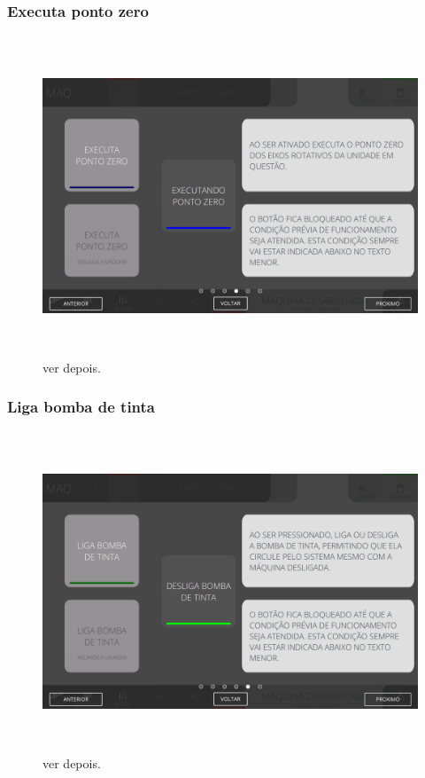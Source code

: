\newpage
\thispagestyle{fancy}
\vspace*{\fill}
\subsubsection{\small{Executa ponto zero}}
\begin{figure}[h]
  \centering
  \includegraphics[width=576px,height=360px]{src/images/04-printter/02-printter/commands/e-4.png}
  \caption{ver depois.}
   \label{}
\end{figure}
\vspace*{\fill}

\newpage
\thispagestyle{fancy}
\vspace*{\fill}
\subsubsection{\small{Liga bomba de tinta}}
\begin{figure}[h]
  \centering
  \includegraphics[width=576px,height=360px]{src/images/04-printter/02-printter/commands/e-5.png}
  \caption{ver depois.}
   \label{}
\end{figure}
\vspace*{\fill}

